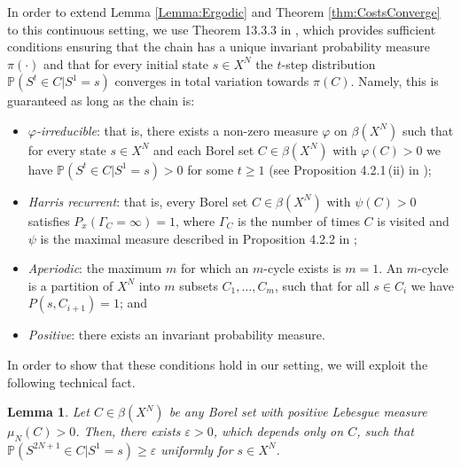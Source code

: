 \documentclass[12pt,english]{article}
\newtheorem{lemma}{Lemma}
\newcommand{\PP}{\mathbb{P}}
\begin{document}
{In order to extend Lemma \ref{Lemma:Ergodic} and Theorem \ref{thm:CostsConverge} to this continuous setting, we use Theorem 13.3.3 in \cite{meyn2012markov}, which provides sufficient conditions ensuring that the chain has a unique invariant probability measure $\pi(\cdot)$ and that 
for every initial state $s\in X^N$
the $t$-step 
distribution $\PP(S^t\in C|S^1=s)$ converges in total variation towards $\pi(C)$. Namely, this is guaranteed as long as the chain is:
\vspace{-1ex}

\begin{itemize}
\item[\bf a)] {\em $\varphi$-irreducible}: that is, there exists a non-zero measure $\varphi$ on $\beta(X^N)$ such that for every state $s \in X^N$ and each Borel set $C\in \beta(X^N)$ with  $\varphi(C)>0$ we have $\PP(S^t\in C|S^1=s)>0$ for some $t\geq 1$ (see Proposition 4.2.1\,(ii) in \citealt{meyn2012markov});\vspace{-1ex}

\item[\bf b)] {\em Harris recurrent}: that is, every Borel set $C\in\beta(X^N)$ with $\psi(C)>0$ satisfies $P_x(\Gamma_C=\infty)=1$, where $\Gamma_C$ is the number of times $C$ is visited and $\psi$ is the maximal measure  described in Proposition 4.2.2 in \cite{meyn2012markov};
\vspace{-1ex}
\item[\bf c)] {\em Aperiodic}: the maximum $m$ for which an $m$-cycle exists is $m=1$. An $m$-cycle is a partition of $X^N$ into $m$ subsets $C_1,\ldots,C_m$, such that for all $s \in C_i$ we have $ P(s, C_{i+1})=1$; and
\vspace{-1ex}
\item[\bf d)] {\em Positive}: there exists an invariant probability measure.
\vspace{-1ex}
\end{itemize}
In order to show that these conditions hold in our setting, we will exploit the following technical fact.

\begin{lemma}\label{Lemma:TechnicalAppendix}
    Let $C\in \beta(X^N)$ be any  Borel set with  positive Lebesgue measure $\mu_N(C)>0$. Then, there exists $\varepsilon>0$, which depends only on $C$, such that  $\PP(S^{2N+1}\in C | S^1=s) \geq \varepsilon$ uniformly for  $s \in X^N$.
    
\end{lemma}

}
\end{document}
